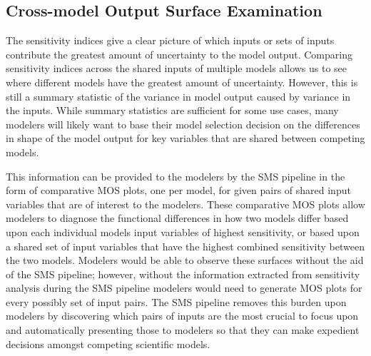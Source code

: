 \subsection{Cross-model Output Surface Examination \label{sec:multi_mod_surface}}
The sensitivity indices give a clear picture of which inputs or sets of inputs contribute the greatest amount of uncertainty to the model output.
Comparing sensitivity indices across the shared inputs of multiple models allows us to see where different models have the greatest amount of uncertainty.
However, this is still a summary statistic of the variance in model output caused by variance in the inputs.
While summary statistics are sufficient for some use cases, many modelers will likely want to base their model selection decision on the differences in shape of the model output for key variables that are shared between competing models.

This information can be provided to the modelers by the SMS pipeline in the form of comparative MOS plots, one per model, for given pairs of shared input variables that are of interest to the modelers.
These comparative MOS plots allow modelers to diagnose the functional differences in how two models differ based upon each individual models input variables of highest sensitivity, or based upon a shared set of input variables that have the highest combined sensitivity between the two models.
Modelers would be able to observe these surfaces without the aid of the SMS pipeline; however, without the information extracted from sensitivity analysis during the SMS pipeline modelers would need to generate MOS plots for every possibly set of input pairs.
The SMS pipeline removes this burden upon modelers by discovering which pairs of inputs are the most crucial to focus upon and automatically presenting those to modelers so that they can make expedient decisions amongst competing scientific models.
